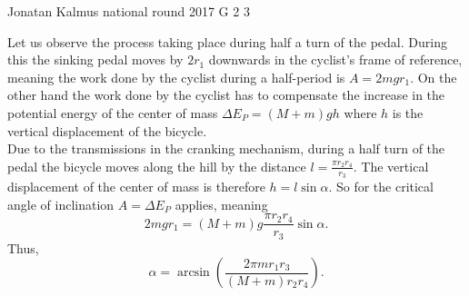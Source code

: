 \documentclass[11pt]{article}
\begin{document}
{Jonatan Kalmus} %
{national round} %
{2017} %
{G 2} %
{3} %
{

\ifEngSolution
Let us observe the process taking place during half a turn of the pedal. During this the sinking pedal moves by $2r_1$ downwards in the cyclist’s frame of reference, meaning the work done by the cyclist during a half-period is $A = 2mgr_1$. On the other hand the work done by the cyclist has to compensate the increase in the potential energy of the center of mass $\Delta E_P = (M + m)gh$ where $h$ is the vertical displacement of the bicycle.\\
Due to the transmissions in the cranking mechanism, during a half turn of the pedal the bicycle moves along the hill by the distance $l=\frac{\pi r_2 r_4}{r_3}$. The vertical displacement of the center of mass is therefore $h = l\sin\alpha$. So for the critical angle of inclination $A = \Delta E_P$ applies, meaning 
\[
2mgr_1 = (M + m)g\frac{\pi r_2r_4}{r_3}\sin\alpha.
\]
Thus, 
\[
\alpha = \arcsin\left(\frac{2\pi mr_1r_3}{(M + m)r_2r_4}\right).
\]
\fi
}
\end{document}
